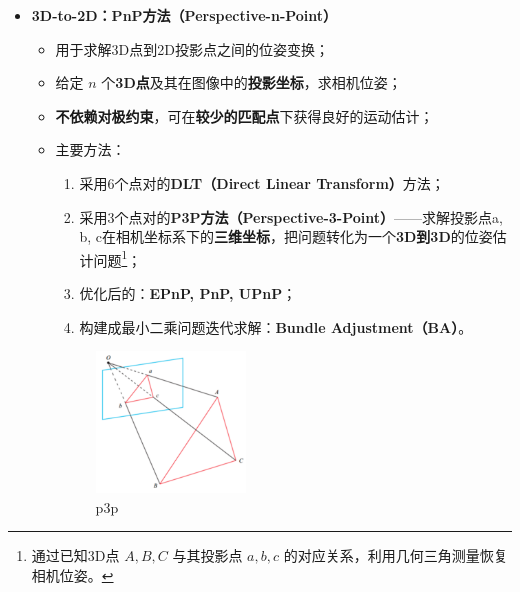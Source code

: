 \documentclass[../main.tex]{subfiles}
\begin{document}
\begin{enumerate}
\begin{itemize}
\begin{enumerate}
\begin{itemize}
\begin{itemize}
        \item \textbf{3D-to-2D：PnP方法（Perspective-n-Point）}
        \begin{itemize}
            \item 用于求解3D点到2D投影点之间的位姿变换；
            \item 给定 $n$ 个\textbf{3D点}及其在图像中的\textbf{投影坐标}，求相机位姿；
            \item \textbf{不依赖对极约束}，可在\textbf{较少的匹配点}下获得良好的运动估计；
            \item 主要方法：
            \begin{enumerate}
                \item 采用6个点对的\textbf{DLT（Direct Linear Transform）}方法；
                \item 采用3个点对的\textbf{P3P方法（Perspective-3-Point）}——求解投影点a, b, c在相机坐标系下的\textbf{三维坐标}，把问题转化为一个\textbf{3D到3D}的位姿估计问题\footnote{通过已知3D点 $A,B,C$ 与其投影点 $a,b,c$ 的对应关系，利用几何三角测量恢复相机位姿。}；
                \item 优化后的：\textbf{EPnP, PnP, UPnP}；
                \item 构建成最小二乘问题迭代求解：\textbf{Bundle Adjustment（BA）}。
            \end{enumerate}
                                                \begin{figure}[H]
                                                    \centering
                                                    \includegraphics[width=0.4\textwidth]{images/p3p.png}
                                                    \caption{p3p}
                                                \end{figure}
        \end{itemize}
    \end{itemize}


\end{itemize}
\end{enumerate}
\end{itemize}
\end{enumerate}
\end{document}
